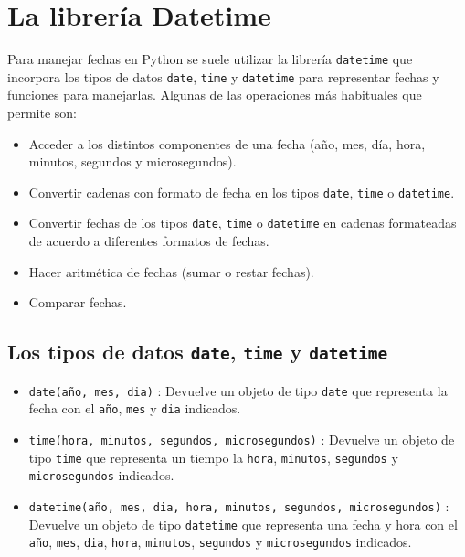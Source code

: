 \documentclass[
  spanish,
  a4paper,
]{scrreport}
\providecommand{\tightlist}{%
  \setlength{\itemsep}{0pt}\setlength{\parskip}{0pt}}
\begin{document}

\chapter{La librería Datetime}\label{la-libreruxeda-datetime}

Para manejar fechas en Python se suele utilizar la librería
\texttt{datetime} que incorpora los tipos de datos \texttt{date},
\texttt{time} y \texttt{datetime} para representar fechas y funciones
para manejarlas. Algunas de las operaciones más habituales que permite
son:

\begin{itemize}
\tightlist
\item
  Acceder a los distintos componentes de una fecha (año, mes, día, hora,
  minutos, segundos y microsegundos).
\item
  Convertir cadenas con formato de fecha en los tipos \texttt{date},
  \texttt{time} o \texttt{datetime}.
\item
  Convertir fechas de los tipos \texttt{date}, \texttt{time} o
  \texttt{datetime} en cadenas formateadas de acuerdo a diferentes
  formatos de fechas.
\item
  Hacer aritmética de fechas (sumar o restar fechas).
\item
  Comparar fechas.
\end{itemize}

\section{\texorpdfstring{Los tipos de datos \texttt{date}, \texttt{time}
y
\texttt{datetime}}{Los tipos de datos date, time y datetime}}\label{los-tipos-de-datos-date-time-y-datetime}

\begin{itemize}
\tightlist
\item
  \texttt{date(año,\ mes,\ dia)} : Devuelve un objeto de tipo
  \texttt{date} que representa la fecha con el \texttt{año},
  \texttt{mes} y \texttt{dia} indicados.
\item
  \texttt{time(hora,\ minutos,\ segundos,\ microsegundos)} : Devuelve un
  objeto de tipo \texttt{time} que representa un tiempo la
  \texttt{hora}, \texttt{minutos}, \texttt{segundos} y
  \texttt{microsegundos} indicados.
\item
  \texttt{datetime(año,\ mes,\ dia,\ hora,\ minutos,\ segundos,\ microsegundos)}
  : Devuelve un objeto de tipo \texttt{datetime} que representa una
  fecha y hora con el \texttt{año}, \texttt{mes}, \texttt{dia},
  \texttt{hora}, \texttt{minutos}, \texttt{segundos} y
  \texttt{microsegundos} indicados.
\end{itemize}
\end{document}
